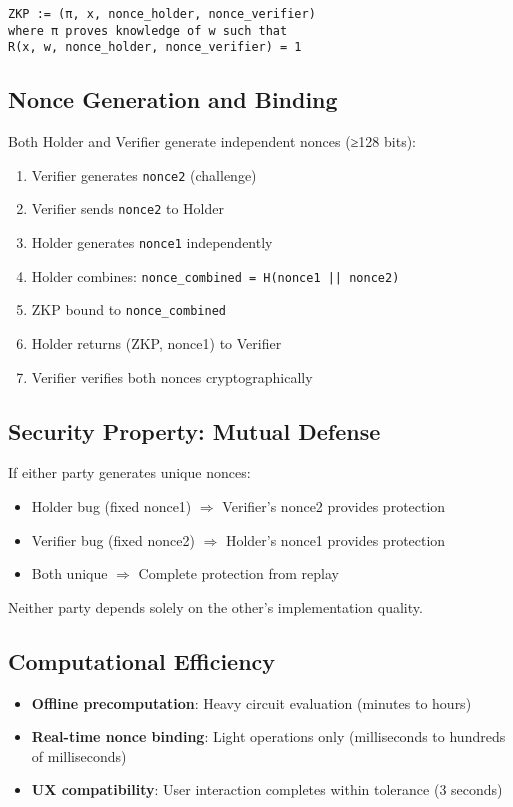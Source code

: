 \begin{verbatim}
ZKP := (π, x, nonce_holder, nonce_verifier)
where π proves knowledge of w such that
R(x, w, nonce_holder, nonce_verifier) = 1
\end{verbatim}

\subsection{Nonce Generation and Binding}

Both Holder and Verifier generate independent nonces (≥128 bits):

\begin{enumerate}
  \item Verifier generates \texttt{nonce2} (challenge)
  \item Verifier sends \texttt{nonce2} to Holder
  \item Holder generates \texttt{nonce1} independently
  \item Holder combines: \texttt{nonce\_combined = H(nonce1 || nonce2)}
  \item ZKP bound to \texttt{nonce\_combined}
  \item Holder returns (ZKP, nonce1) to Verifier
  \item Verifier verifies both nonces cryptographically
\end{enumerate}

\subsection{Security Property: Mutual Defense}

If either party generates unique nonces:
\begin{itemize}
  \item Holder bug (fixed nonce1) $\Rightarrow$ Verifier's nonce2 provides protection
  \item Verifier bug (fixed nonce2) $\Rightarrow$ Holder's nonce1 provides protection
  \item Both unique $\Rightarrow$ Complete protection from replay
\end{itemize}

Neither party depends solely on the other's implementation quality.

\subsection{Computational Efficiency}

\begin{itemize}
  \item \textbf{Offline precomputation}: Heavy circuit evaluation (minutes to hours)
  \item \textbf{Real-time nonce binding}: Light operations only (milliseconds to hundreds of milliseconds)
  \item \textbf{UX compatibility}: User interaction completes within tolerance (3 seconds)
\end{itemize}

